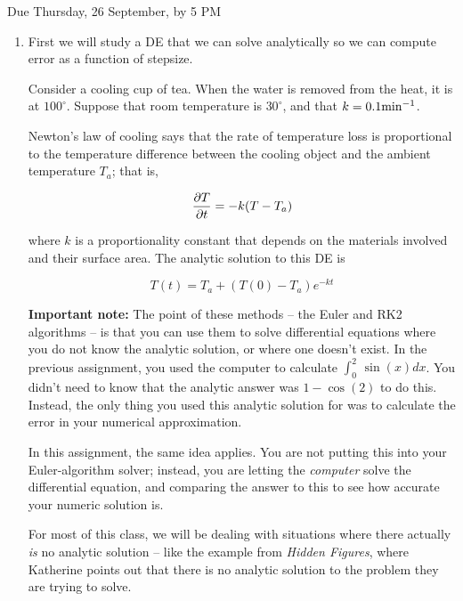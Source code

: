 \documentclass[12pt]{article}
\def\PAR#1#2{ {{\partial #1}\over{\partial #2}} }
\begin{document}
\Large
\centerline{}
\centerline{Due Thursday, 26 September, by 5 PM}
\normalsize

\begin{enumerate}
\item{

First we will study a DE that we can solve analytically so we can compute error as a function of stepsize.

Consider a cooling cup of tea. When the water is removed from the heat, it is at $100^\circ$. Suppose that room temperature is $30^\circ$, and that $k=0.1 {\rm {min}}^{-1}$.

Newton's law of cooling says that the rate of temperature loss is proportional to the temperature difference between the cooling object and the ambient temperature $T_a$; that is,

\begin{equation}
\PAR{T}{t} = -k(T-T_a)
\end{equation}

where $k$ is a proportionality constant that depends on the materials involved and their surface area. The analytic solution to this DE is

\begin{equation}
T(t) = T_a + (T(0) - T_a)e^{-kt}
\end{equation}
  
{\bf Important note:} The point of these methods -- the Euler and RK2 algorithms -- is that you can use them to solve differential equations where you do not know the analytic solution, or where one doesn't exist. In the previous assignment, you
used the computer to calculate $\int_0^2 \,\sin(x) dx$. You didn't need to know that the analytic answer was $1-\cos(2)$ to do this. Instead, the only thing you used this analytic solution for was to calculate the error in your numerical approximation.

In this assignment, the same idea applies. You are not putting this into your Euler-algorithm solver; instead, you are letting the {\it computer} solve the differential equation, and comparing the answer to this to see how accurate your numeric solution is.

For most of this class, we will be dealing with situations where there actually {\it is} no analytic solution -- like the example from {\it Hidden Figures}, where Katherine points out that there is no analytic solution to the problem they are trying to solve.


\begin{enumerate}


\end{enumerate}}
\end{enumerate}
\end{document}
